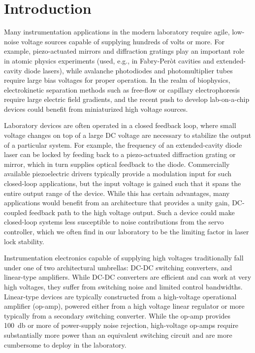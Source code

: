 \documentclass[aip,rsi,reprint]{revtex4-1} %
\begin{document}
\section{Introduction}
\label{Sec:Introduction}

Many instrumentation applications in the modern laboratory require agile, low-noise voltage sources capable of supplying hundreds of volts or more.
For example, piezo-actuated mirrors and diffraction gratings play an important role in atomic physics experiments (used, e.g., in Fabry-Per{\`o}t cavities\cite{Riedle1994a,Bohlouli-Zanjani2006a} and extended-cavity diode lasers\cite{Wieman1991a}), while avalanche photodiodes and photomultiplier tubes require large bias voltages for proper operation.
In the realm of biophysics, electrokinetic separation methods such as free-flow or capillary electrophoresis\cite{Kohlheyer2008a} require large electric field gradients, and the recent push to develop lab-on-a-chip devices could benefit from miniaturized high voltage sources\cite{Temiz2015a}.

Laboratory devices are often operated in a closed feedback loop, where small voltage changes on top of a large DC voltage are necessary to stabilize the output of a particular system.
For example, the frequency of an extended-cavity diode laser can be locked by feeding back to a piezo-actuated diffraction grating or mirror, which in turn supplies optical feedback to the diode.
Commercially available piezoelectric drivers typically provide a modulation input for  such closed-loop applications, but the input voltage is gained such that it spans the entire output range of the device.
While this has certain advantages, many applications would benefit from an architecture that provides a unity gain, DC-coupled feedback path to the high voltage output. 
Such a device could make closed-loop systems less susceptible to noise contributions from the servo controller, which we often find in our laboratory to be the limiting factor in laser lock stability.

Instrumentation electronics capable of supplying high voltages traditionally fall under one of two architectural umbrellas: DC-DC switching converters, and linear-type amplifiers.
While DC-DC converters are efficient and can work at very high voltages, they suffer from switching noise and limited control bandwidths.
Linear-type devices are typically constructed from a high-voltage operational amplifier (op-amp), powered either from a high voltage linear regulator or more typically from a secondary switching converter.
While the op-amp provides \SI{100}{\decibel} or more of power-supply noise rejection, high-voltage op-amps require substantially more power than an equivalent switching circuit and are more cumbersome to deploy in the laboratory.
\end{document}
